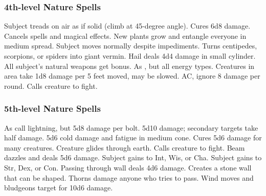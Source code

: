 \subsubsection{4th-level Nature Spells}
\begin{spelllist}
   Subject treads on air as if solid (climb at 45-degree angle).
   Cures 6d8 damage.
   Cancels spells and magical effects.
   New plants grow and entangle everyone in medium spread.
   Subject moves normally despite impediments.
   Turns centipedes, scorpions, or spiders into giant vermin.
   Hail deals 4d4 damage in small cylinder.
   All subject's natural weapons get  bonus.
   As , but all energy types.
   Creatures in area take 1d8 damage per 5 feet moved, may be slowed.
    AC, ignore 8 damage per round.
   Calls creature to fight.
\end{spelllist}

\subsubsection{5th-level Nature Spells}
\begin{spelllist}
   As call lightning, but 5d8 damage per bolt.
   5d10 damage; secondary targets take half damage.
   5d6 cold damage and fatigue in medium cone.
   Cures 5d6 damage for many creatures.
   Creature glides through earth. 
   Calls creature to fight.
   Beam dazzles and deals 5d6 damage.
   Subject gains  to Int, Wis, or Cha.
   Subject gains  to Str, Dex, or Con.
   Passing through wall deals 4d6 damage.
   Creates a stone wall that can be shaped.
   Thorns damage anyone who tries to pass.
   Wind moves and bludgeons target for 10d6 damage.
\end{spelllist}

